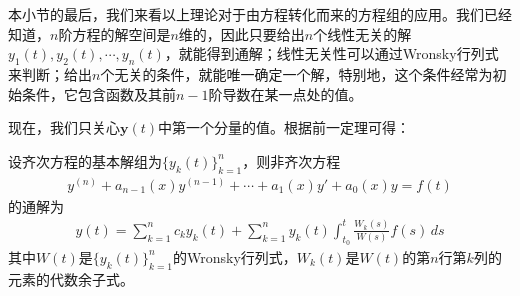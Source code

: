 本小节的最后，我们来看以上理论对于由方程转化而来的方程组的应用。我们已经知道，$n$阶方程的解空间是$n$维的，因此只要给出$n$个线性无关的解$y_1(t),y_2(t),\cdots,y_n(t)$，就能得到通解；线性无关性可以通过Wronsky行列式来判断；给出$n$个无关的条件，就能唯一确定一个解，特别地，这个条件经常为初始条件，它包含函数及其前$n-1$阶导数在某一点处的值。

现在，我们只关心$\mathbf{y}(t)$中第一个分量的值。根据前一定理可得：
\begin{theorem}
    设齐次方程的基本解组为$\{y_k(t)\}_{k=1}^n$，则非齐次方程\begin{align*}
    y^{(n)}+a_{n-1}(x)y^{(n-1)}+\cdots+a_1(x)y'+a_0(x)y=f(t)
    \end{align*}
    的通解为\begin{align*}
    y(t)=\sum_{k=1}^n c_k y_k(t)+\sum_{k=1}^n y_k(t)\int_{t_0}^t \frac{W_k(s)}{W(s)}f(s)\,ds
    \end{align*}
    其中$W(t)$是$\{y_k(t)\}_{k=1}^n$的Wronsky行列式，$W_k(t)$是$W(t)$的第$n$行第$k$列的元素的代数余子式。
\end{theorem}
